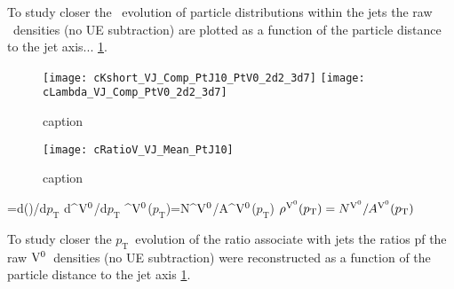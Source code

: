 To study closer the \pt\ evolution of particle distributions within the jets the raw \Vzero\ densities (no UE subtraction) are plotted as a function of the particle distance to the jet axis... \ref{fig:LKR}.

\begin{figure}[htbp]
   \centering
   \texttt{[image: cKshort\_VJ\_Comp\_PtJ10\_PtV0\_2d2\_3d7]}
   \texttt{[image: cLambda\_VJ\_Comp\_PtV0\_2d2\_3d7]}
   \caption{caption}
   \label{fig:LKR}
\end{figure}

\begin{figure}[htbp]
   \centering
   \texttt{[image: cRatioV\_VJ\_Mean\_PtJ10]}
   \caption{caption}
   \label{fig:L2KvsR}
\end{figure}



\newcommand{\pt}           {\ensuremath{p_{\mathrm{T}}}}
\newcommand{\Vzero}        {\ensuremath{{\rm V}^{0}}}
\frac{{\mathrm d}\rho^{\Vzero}}{{\mathrm d}\pt}={\mathrm d}\left(\frac{N^{\Vzero}}{A^{\Vzero}}\right)/{\mathrm d}\pt
\newline
{\mathrm d}\rho^{\Vzero}/{\mathrm d}\pt
\newline
\rho^{\Vzero}(\pt)=N^{\Vzero}/A^{\Vzero}(\pt)
\newline
{\ensuremath{ \rho^{\Vzero}(\pt) = N^{\Vzero} / A^{\Vzero} (\pt) }}

To study closer the \pt\ evolution of the ratio associate with jets the ratios pf the raw \Vzero\ densities (no UE subtraction) were reconstructed as a function of the particle distance to the jet axis \ref{fig:LKR}.


